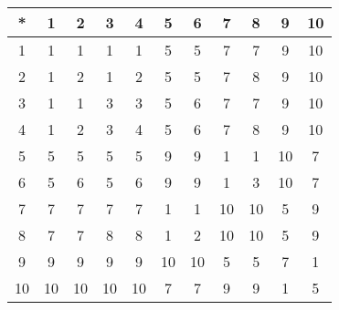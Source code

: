 \begin{tabular}[t]{c|cccccccccc}
*&1&2&3&4&5&6&7&8&9&10 \\ \hline
    1&1&1&1&1&5&5&7&7&9&10 \\
    2&1&2&1&2&5&5&7&8&9&10 \\
    3&1&1&3&3&5&6&7&7&9&10 \\
    4&1&2&3&4&5&6&7&8&9&10 \\
    5&5&5&5&5&9&9&1&1&10&7 \\
    6&5&6&5&6&9&9&1&3&10&7 \\
    7&7&7&7&7&1&1&10&10&5&9 \\
    8&7&7&8&8&1&2&10&10&5&9 \\
    9&9&9&9&9&10&10&5&5&7&1 \\
    10&10&10&10&10&7&7&9&9&1&5 
\end{tabular}


